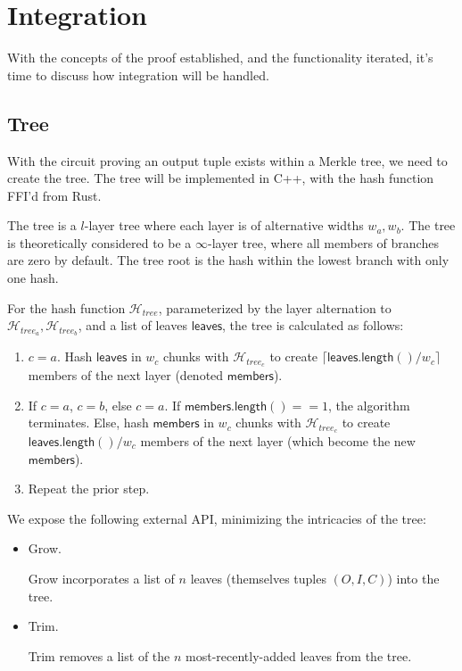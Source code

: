 \documentclass[]{article}
\begin{document}
\section{Integration}

With the concepts of the proof established, and the functionality iterated, it's time to discuss how integration will be handled.

\subsection{Tree}

With the circuit proving an output tuple exists within a Merkle tree, we need to create the tree. The tree will be implemented in C++, with the hash function FFI'd from Rust.

The tree is a $l$-layer tree where each layer is of alternative widths $w_a, w_b$. The tree is theoretically considered to be a $\infty$-layer tree, where all members of branches are zero by default. The tree root is the hash within the lowest branch with only one hash.

For the hash function $\mathcal{H}_{tree}$, parameterized by the layer alternation to $\mathcal{H}_{tree_a}, \mathcal{H}_{tree_b}$, and a list of leaves $\mathsf{leaves}$, the tree is calculated as follows:

\begin{enumerate}
	\item $c = a$. Hash $\mathsf{leaves}$ in $w_c$ chunks with $\mathcal{H}_{tree_c}$ to create $\lceil \mathsf{leaves.length()} / w_c \rceil$ members of the next layer (denoted $\mathsf{members}$).
	\item If $c = a$, $c = b$, else $c = a$. If $\mathsf{members.length()} == 1$, the algorithm terminates. Else, hash $\mathsf{members}$ in $w_c$ chunks with $\mathcal{H}_{tree_c}$ to create $\mathsf{leaves.length()} / w_c$ members of the next layer (which become the new $\mathsf{members}$).
	\item Repeat the prior step.
\end{enumerate}

We expose the following external API, minimizing the intricacies of the tree:

\begin{itemize}
  \item Grow.
  
  Grow incorporates a list of $n$ leaves (themselves tuples $(O, I, C)$) into the tree.
  \item Trim.

  Trim removes a list of the $n$ most-recently-added leaves from the tree.
\end{itemize}
\end{document}
